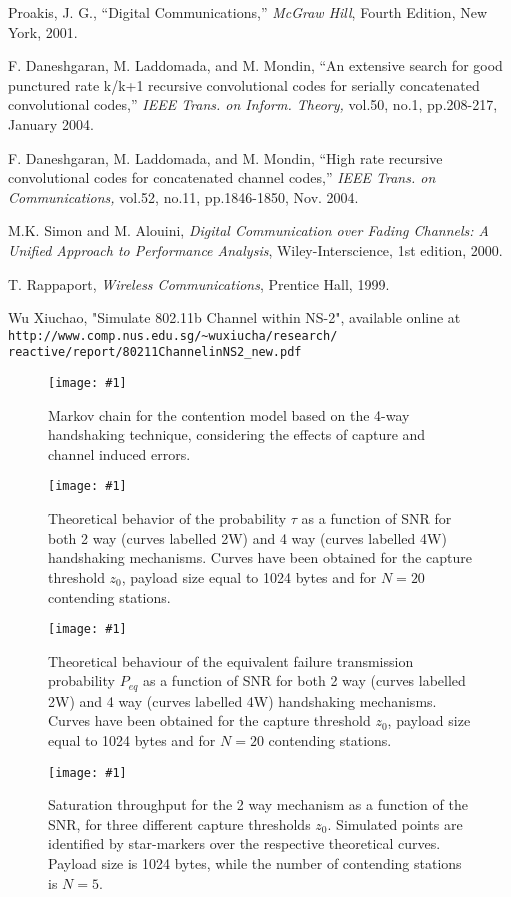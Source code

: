 \documentclass[10pt,onecolumn,a4paper]{IEEEtran}
\newcommand{\figuramedia}[3]
{
\begin{figure}
  \centering
 \texttt{[image: \#1]}
  \caption{#2}\label{#3}
\end{figure}
}
\newcommand{\figura}[3]
{
\begin{figure}
  \centering
 \texttt{[image: \#1]}
  \caption{#2}\label{#3}
\end{figure}
}
\begin{document}
\begin{thebibliography}{99}
 Proakis, J. G., ``Digital Communications,'' {\em
McGraw Hill}, Fourth Edition, New York, 2001.

 F. Daneshgaran, M. Laddomada, and M. Mondin,
``An extensive search for good punctured rate k/k+1 recursive
convolutional codes for serially concatenated convolutional
codes,'' {\sl IEEE Trans. on Inform. Theory,} vol.50, no.1,
pp.208-217, January 2004.

 F. Daneshgaran, M. Laddomada, and M. Mondin,
``High rate recursive convolutional codes for concatenated channel
codes,'' {\sl IEEE Trans. on Communications,} vol.52, no.11,
pp.1846-1850, Nov. 2004.


M.K. Simon and M. Alouini, {\em Digital Communication over Fading
Channels: A Unified Approach to Performance Analysis},
Wiley-Interscience, 1st edition, 2000.

T. Rappaport, {\em Wireless Communications}, Prentice Hall, 1999.

Wu Xiuchao, "Simulate 802.11b Channel within NS-2", available
online at \verb"http://www.comp.nus.edu.sg/~wuxiucha/research/"
\verb"reactive/report/80211ChannelinNS2_new.pdf"

\end{thebibliography}
\clearpage
\figuramedia{chain_4way.eps}{Markov chain for the contention model
based on the 4-way handshaking technique, considering the effects
of capture and channel induced errors.}{fig.chain}
\clearpage
\figura{N20_tau_1024bytes.eps}{Theoretical behavior of the
probability $\tau$ as a function of SNR for both 2 way (curves
labelled 2W) and 4 way (curves labelled 4W) handshaking
mechanisms. Curves have been obtained for the capture threshold
$z_0$, payload size equal to 1024 bytes and for $N=20$ contending
stations.}{N20_tau_1024bytes}
\clearpage
\figura{N20_P_eq_1024bytes.eps}{Theoretical behaviour of the
equivalent failure transmission probability $P_{eq}$ as a function
of SNR for both 2 way (curves labelled 2W) and 4 way (curves
labelled 4W) handshaking mechanisms. Curves have been obtained for
the capture threshold $z_0$, payload size equal to 1024 bytes and
for $N=20$ contending stations.}{N20_P_eq_1024bytes}
\clearpage
\figura{2W_1024b_N5.eps}{Saturation throughput for the 2 way
mechanism as a function of the SNR, for three different capture
thresholds $z_0$. Simulated points are identified by star-markers
over the respective theoretical curves. Payload size is 1024
bytes, while the number of contending stations is
$N=5$.}{2W_1024b_N5}
\end{document}
